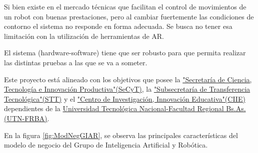 \documentclass[11pt]{charter}
\begin{document}
Si bien existe en el mercado técnicas que facilitan el control de movimientos de un robot con buenas prestaciones, pero al cambiar fuertemente las condiciones de contorno  el sistema no responde en forma adecuada. Se busca no tener esa limitación con la utilización de herramientas de AR.

El sistema (hardware-software) tiene que ser robusto para que permita realizar las distintas pruebas a las que se va a someter.

Este proyecto está alineado con los objetivos que posee la \href{https://www.frba.utn.edu.ar/secretarias/}{"Secretaría de Ciencia, Tecnología e Innovación Productiva"(SeCyT)}, la \href{https://www.frba.utn.edu.ar/transferencia/transferencia-tecnologica/}{"Subsecretaría de Transferencia Tecnológica"(STT)} y el \href{https://www.frba.utn.edu.ar/ciie/}{"Centro de Investigación, Innovación Educativa"(CIIE)} dependientes de la \href{https://www.frba.utn.edu.ar/}{Universidad Tecnológica Nacional-Facultad Regional Bs.As.(UTN-FRBA)}.




En la figura \ref{fig:ModNegGIAR}, se observa las principales características del modelo de negocio del Grupo de Inteligencia Artificial y Robótica.
\end{document}
